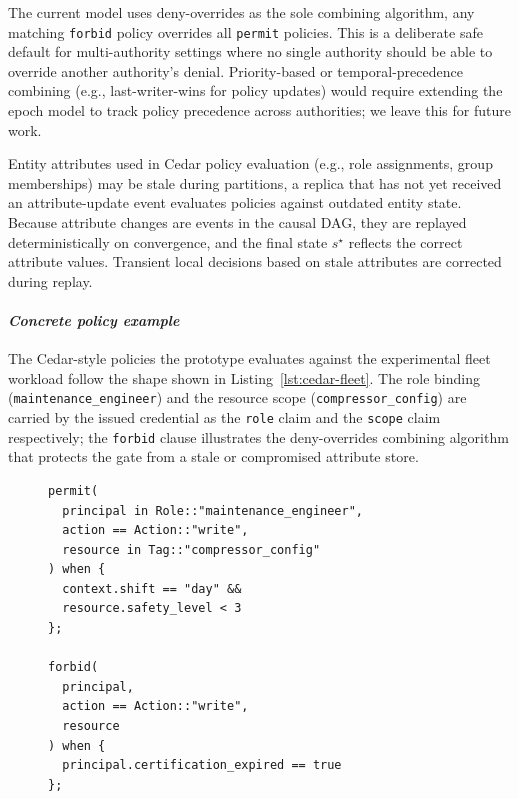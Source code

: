 \documentclass[10pt,journal,compsoc]{IEEEtran}
\begin{document}
The current model uses deny-overrides as the sole combining algorithm, any matching \texttt{forbid} policy overrides all \texttt{permit} policies. This is a deliberate safe default for multi-authority settings where no single authority should be able to override another authority's denial. Priority-based or temporal-precedence combining (e.g., last-writer-wins for policy updates) would require extending the epoch model to track policy precedence across authorities; we leave this for future work.

Entity attributes used in Cedar policy evaluation (e.g., role assignments, group memberships) may be stale during partitions, a replica that has not yet received an attribute-update event evaluates policies against outdated entity state. Because attribute changes are events in the causal DAG, they are replayed deterministically on convergence, and the final state $s^\star$ reflects the correct attribute values. Transient local decisions based on stale attributes are corrected during replay.

\paragraph*{\textit{\textbf{Concrete policy example}}}
The Cedar-style policies the prototype evaluates against the experimental fleet workload follow the shape shown in Listing~\ref{lst:cedar-fleet}. The role binding (\texttt{maintenance\_engineer}) and the resource scope (\texttt{compressor\_config}) are carried by the issued credential as the \texttt{role} claim and the \texttt{scope} claim respectively; the \texttt{forbid} clause illustrates the deny-overrides combining algorithm that protects the gate from a stale or compromised attribute store.

\begin{figure}[!htbp]
\begin{lstlisting}[basicstyle=\ttfamily\footnotesize,frame=single,caption={Concrete Cedar-style policy used in the fleet experiments. The implemented evaluator supports the highlighted constructs (permit/forbid, role/scope matching, attribute equality, deny-overrides); the rest is illustrative for the discussion in Section~\ref{sec:discussion}.},label={lst:cedar-fleet}]
permit(
  principal in Role::"maintenance_engineer",
  action == Action::"write",
  resource in Tag::"compressor_config"
) when {
  context.shift == "day" &&
  resource.safety_level < 3
};

forbid(
  principal,
  action == Action::"write",
  resource
) when {
  principal.certification_expired == true
};
\end{lstlisting}
\end{figure}
\end{document}
